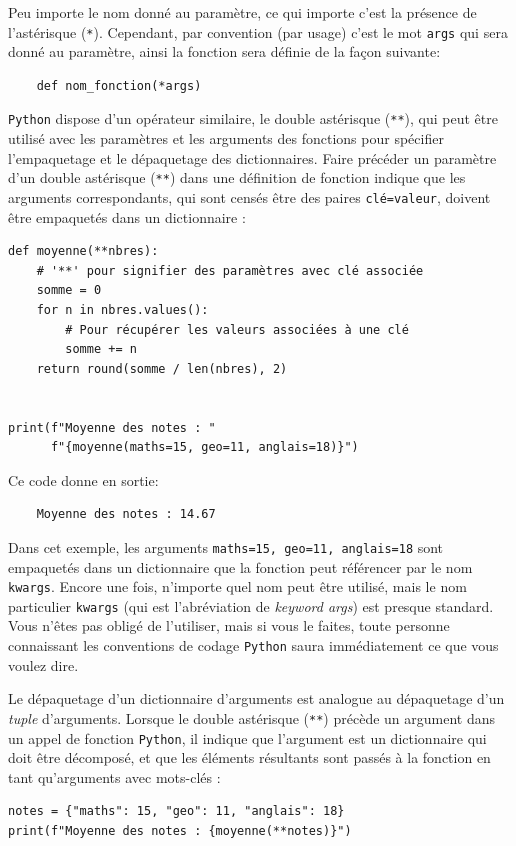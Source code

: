 \documentclass[a4paper,11pt]{book}
\begin{document}
Peu importe le nom donné au paramètre, ce qui importe c'est la présence de l'astérisque (\texttt{*}). Cependant, par convention (par usage) c'est le mot \texttt{args} qui sera donné au paramètre, ainsi la fonction sera définie de la façon suivante:
\begin{verbatim}
    def nom_fonction(*args)
\end{verbatim}
\medskip

\texttt{Python} dispose d'un opérateur similaire, le double astérisque (\texttt{**}), qui peut être utilisé avec les paramètres et les arguments des fonctions pour spécifier l'empaquetage et le dépaquetage des dictionnaires. Faire précéder un paramètre d'un double astérisque (\texttt{**}) dans une définition de fonction indique que les arguments correspondants, qui sont censés être des paires \texttt{clé=valeur}, doivent être empaquetés dans un dictionnaire :
\begin{lstlisting}[caption=Paramètres avec clé associée]
def moyenne(**nbres):
    # '**' pour signifier des paramètres avec clé associée
    somme = 0
    for n in nbres.values():
        # Pour récupérer les valeurs associées à une clé
        somme += n
    return round(somme / len(nbres), 2)


print(f"Moyenne des notes : "
      f"{moyenne(maths=15, geo=11, anglais=18)}")
\end{lstlisting}
\medskip

Ce code donne en sortie:
\begin{verbatim}
    Moyenne des notes : 14.67
\end{verbatim}
\medskip

Dans cet exemple, les arguments \texttt{maths=15, geo=11, anglais=18} sont empaquetés dans un dictionnaire que la fonction peut référencer par le nom \texttt{kwargs}. Encore une fois, n'importe quel nom peut être utilisé, mais le nom particulier \texttt{kwargs} (qui est l'abréviation de \og \textit{keyword args}\fg{}) est presque standard. Vous n'êtes pas obligé de l'utiliser, mais si vous le faites, toute personne connaissant les conventions de codage \texttt{Python} saura immédiatement ce que vous voulez dire.
\medskip

Le dépaquetage d'un dictionnaire d'arguments est analogue au dépaquetage d'un \textit{tuple} d'arguments. Lorsque le double astérisque (\texttt{**}) précède un argument dans un appel de fonction \texttt{Python}, il indique que l'argument est un dictionnaire qui doit être décomposé, et que les éléments résultants sont passés à la fonction en tant qu'arguments avec mots-clés :
\begin{lstlisting}[caption=Dépaquetage d'un dictionnaire]
notes = {"maths": 15, "geo": 11, "anglais": 18}
print(f"Moyenne des notes : {moyenne(**notes)}")
\end{lstlisting}
\medskip
\end{document}
